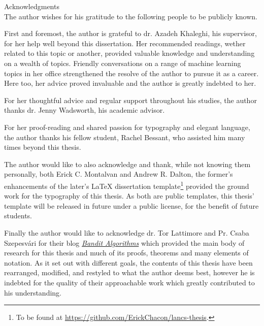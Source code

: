 
	
{\centering 
{ \huge Acknowledgments}\\
\vspace{5em}
The author wishes for his gratitude to the following people to be publicly known. 
\hfill
\par First and foremost, the author is grateful to dr. Azadeh Khaleghi, his supervisor, for her help well beyond this dissertation. Her recommended readings, wether related to this topic or another, provided valuable knowledge and understanding on a wealth of topics. Friendly conversations on a range of machine learning topics in her office strengthened the resolve of the author to pursue it as a career. Here too, her advice proved invaluable and the author is greatly indebted to her. 
\par For her thoughtful advice and regular support throughout his studies, the author thanks dr. Jenny Wadsworth, his academic advisor.  
\par For her proof-reading and shared passion for typography and elegant language, the author thanks his fellow student, Rachel Bessant, who assisted him many times beyond this thesis.  
\par The author would like to also acknowledge and thank, while not knowing them personally, both Erick C. Montalvan and Andrew R. Dalton, the former's enhancements of the later's {\LaTeX } dissertation template\footnote{To be found at {\url{https://github.com/ErickChacon/lancs-thesis}}.} provided the ground work for the typography of this thesis. As both are public templates, this thesis' template will be released in future under a public license, for the benefit of future students. 
\par Finally the author would like to acknowledge dr. Tor Lattimore and Pr. Csaba Szepesv{\'a}ri for their blog {\href{http://banditalgs.com}{{\em Bandit Algorithms}}} which provided the main body of research for this thesis and much of its proofs, theorems and many elements of notation. As it set out with different goals, the contents of this thesis have been rearranged, modified, and restyled to what the author deems best, however he is indebted for the quality of their approachable work which greatly contributed to his understanding. 
}

	
\vfill